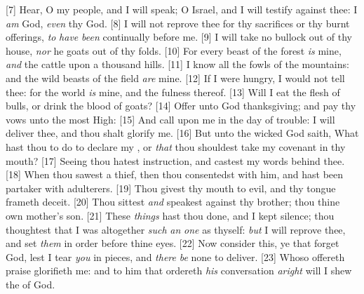 [7] \textcolor[cmyk]{0.99998,1,0,0}{Hear, O my people, and I will speak; O Israel, and I will testify against thee: I \emph{am} God, \emph{even} thy God.}
[8] \textcolor[cmyk]{0.99998,1,0,0}{I will not reprove thee for thy sacrifices or thy burnt offerings, \emph{to} \emph{have} \emph{been} continually before me.}
[9] \textcolor[cmyk]{0.99998,1,0,0}{I will take no bullock out of thy house, \emph{nor} he goats out of thy folds.}
[10] \textcolor[cmyk]{0.99998,1,0,0}{For every beast of the forest \emph{is} mine, \emph{and} the cattle upon a thousand hills.}
[11] \textcolor[cmyk]{0.99998,1,0,0}{I know all the fowls of the mountains: and the wild beasts of the field \emph{are} mine.}
[12] \textcolor[cmyk]{0.99998,1,0,0}{If I were hungry, I would not tell thee: for the world \emph{is} mine, and the fulness thereof.}
[13] \textcolor[cmyk]{0.99998,1,0,0}{Will I eat the flesh of bulls, or drink the blood of goats?}
[14] \textcolor[cmyk]{0.99998,1,0,0}{Offer unto God thanksgiving; and pay thy vows unto the most High:}
[15] \textcolor[cmyk]{0.99998,1,0,0}{And call upon me in the day of trouble: I will deliver thee, and thou shalt glorify me.}
[16] \textcolor[cmyk]{0.99998,1,0,0}{But unto the wicked God saith, What hast thou to do to declare my , or \emph{that} thou shouldest take my covenant in thy mouth?}
[17] \textcolor[cmyk]{0.99998,1,0,0}{Seeing thou hatest instruction, and castest my words behind thee.}
[18] \textcolor[cmyk]{0.99998,1,0,0}{When thou sawest a thief, then thou consentedst with him, and hast been partaker with adulterers.}
[19] \textcolor[cmyk]{0.99998,1,0,0}{Thou givest thy mouth to evil, and thy tongue frameth deceit.}
[20] \textcolor[cmyk]{0.99998,1,0,0}{Thou sittest \emph{and} speakest against thy brother; thou  thine own mother's son.}
[21] \textcolor[cmyk]{0.99998,1,0,0}{These \emph{things} hast thou done, and I kept silence; thou thoughtest that I was altogether \emph{such} \emph{an} \emph{one} as thyself: \emph{but} I will reprove thee, and set \emph{them} in order before thine eyes.}
[22] \textcolor[cmyk]{0.99998,1,0,0}{Now consider this, ye that forget God, lest I tear \emph{you} in pieces, and \emph{there} \emph{be} none to deliver.}
[23] \textcolor[cmyk]{0.99998,1,0,0}{Whoso offereth praise glorifieth me: and to him that ordereth \emph{his} conversation \emph{aright} will I shew the  of God.}